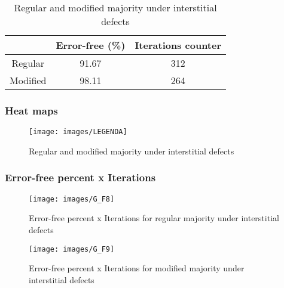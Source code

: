 \begin{table}[h]
\begin{center}
\begin{tabular}{|c|c|c|}
\hline
 & Error-free (\%) & Iterations counter \\
\hline
 Regular & 91.67 & 312 \\
\hline
 Modified & 98.11 & 264 \\
\hline

\end{tabular}
\caption{Regular and modified majority under interstitial defects}
\end{center}
\end{table}

\pagebreak
\subsubsection{Heat maps}

\begin{figure}[h]
\center
{}
\hfill
{}
\linebreak
{\texttt{[image: images/LEGENDA]}
}
\caption{Regular and modified majority under interstitial defects}
\label{figure:majority_t4}
\end{figure}

\subsubsection{Error-free percent x Iterations}

\begin{figure}[h!]
\center
\texttt{[image: images/G\_F8]}
\caption{Error-free percent x Iterations for regular majority under interstitial defects}
\label{figure:majority_reg_gt4}
\end{figure}

\begin{figure}[h!]
\center
\texttt{[image: images/G\_F9]}
\caption{Error-free percent x Iterations for modified majority under interstitial defects}
\label{figure:majority_mod_gt4}
\end{figure}
\pagebreak
